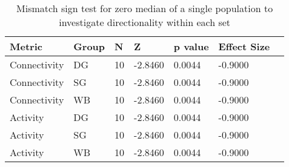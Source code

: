 \begin{table}
\centering
\begin{tabular}[0.2em]{@{}lllllll@{}}\toprule
Metric & Group & N & Z & p value & Effect Size\\\toprule[0.2em]
Connectivity & DG & 10 & -2.8460 & 0.0044 & -0.9000 \\\midrule
Connectivity & SG & 10 & -2.8460 & 0.0044 & -0.9000 \\\midrule
Connectivity & WB & 10 & -2.8460 & 0.0044 & -0.9000 \\\midrule
Activity & DG & 10 & -2.8460 & 0.0044 & -0.9000 \\\midrule
Activity & SG & 10 & -2.8460 & 0.0044 & -0.9000 \\\midrule
Activity & WB & 10 & -2.8460 & 0.0044 & -0.9000 \\\bottomrule[0.2em]
\end{tabular}
\caption{Mismatch sign test for zero median of a single population to investigate directionality within each set\label{tabel:mismatchSets}}
\end{table}
